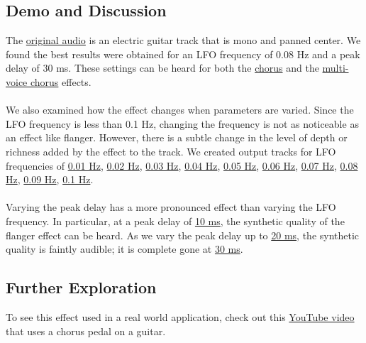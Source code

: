 \subsection{Demo and Discussion}
The \href{run:../InputAudio/22-004 Original Guitar.wav}{original audio} is an electric guitar track that is mono and panned center. We found the best results were obtained for an LFO frequency of 0.08 Hz and a peak delay of 30 ms. These settings can be heard for both the \href{run:../OutputAudio/chorus_22-004 Original Guitar_{freq=0.08Hz}{delay_max=30ms}.wav}{chorus} and the \href{run:../OutputAudio/chorus-multi_22-004 Original Guitar_{freq=0.08Hz}{delay_max=30ms}.wav}{multi-voice chorus} effects. \\ \\
We also examined how the effect changes when parameters are varied. Since the LFO frequency is less than 0.1 Hz, changing the frequency is not as noticeable as an effect like flanger. However, there is a subtle change in the level of depth or richness added by the effect to the track. We created output tracks for LFO frequencies of
\href{run:../OutputAudio/chorus_22-004 Original Guitar_{freq=0.01Hz}{delay_max=30ms}.wav}{0.01 Hz},
\href{run:../OutputAudio/chorus_22-004 Original Guitar_{freq=0.02Hz}{delay_max=30ms}.wav}{0.02 Hz},
\href{run:../OutputAudio/chorus_22-004 Original Guitar_{freq=0.03Hz}{delay_max=30ms}.wav}{0.03 Hz},
\href{run:../OutputAudio/chorus_22-004 Original Guitar_{freq=0.04Hz}{delay_max=30ms}.wav}{0.04 Hz},
\href{run:../OutputAudio/chorus_22-004 Original Guitar_{freq=0.05Hz}{delay_max=30ms}.wav}{0.05 Hz},
\href{run:../OutputAudio/chorus_22-004 Original Guitar_{freq=0.06Hz}{delay_max=30ms}.wav}{0.06 Hz},
\href{run:../OutputAudio/chorus_22-004 Original Guitar_{freq=0.07Hz}{delay_max=30ms}.wav}{0.07 Hz},
\href{run:../OutputAudio/chorus_22-004 Original Guitar_{freq=0.08Hz}{delay_max=30ms}.wav}{0.08 Hz},
\href{run:../OutputAudio/chorus_22-004 Original Guitar_{freq=0.09Hz}{delay_max=30ms}.wav}{0.09 Hz},
\href{run:../OutputAudio/chorus_22-004 Original Guitar_{freq=0.1Hz}{delay_max=30ms}.wav}{0.1 Hz}. \\ \\
Varying the peak delay has a more pronounced effect than varying the LFO frequency. In particular, at a peak delay of \href{run:../OutputAudio/chorus_22-004 Original Guitar_{freq=0.08Hz}{delay_max=10ms}.wav}{10 ms}, the synthetic quality of the flanger effect can be heard. As we vary the peak delay up to \href{run:../OutputAudio/chorus_22-004 Original Guitar_{freq=0.08Hz}{delay_max=20ms}.wav}{20 ms}, the synthetic quality is faintly audible; it is complete gone at \href{run:../OutputAudio/chorus_22-004 Original Guitar_{freq=0.08Hz}{delay_max=30ms}.wav}{30 ms}.

\subsection{Further Exploration}
To see this effect used in a real world application, check out this \href{https://www.youtube.com/watch?v=zmN7fK3fKUE}{YouTube video} that uses a chorus pedal on a guitar.